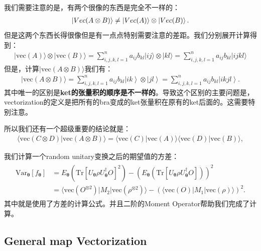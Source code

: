 我们需要注意的是，有两个很像的东西是完全不一样的：
\begin{align}
  \left| Vec(A \otimes B) \right\rangle \neq \left| Vec(A) \right\rangle \otimes \left| Vec(B) \right\rangle.
\end{align}
但是这两个东西长得很像但是有一点点特别需要注意的差距。我们分别展开计算得到：
\begin{align}
  |\mathrm{vec}(A)\rangle\otimes|\mathrm{vec}(B)\rangle=\sum_{i,j,k,l=1}^na_{ij}\left.b_{kl}\right.|ij\rangle\otimes|kl\rangle=\sum_{i,j,k,l=1}^na_{ij}\left.b_{kl}\right.|ijkl\rangle
\end{align}
但是，计算$ |\mathrm{vec}(A\otimes B)\rangle $我们有：
\begin{align}
  |\mathrm{vec}(A\otimes B)\rangle=\sum_{i,j,k,l=1}^na_{ij}\left.b_{kl}\right.\left|ik\right\rangle\otimes\left|jl\right\rangle=\sum_{i,j,k,l=1}^na_{ij}\left.b_{kl}\right.\left|ikjl\right\rangle.
\end{align}
其中唯一的区别是\textbf{ket的张量积的顺序是不一样的}。导致这个区别的主要问题是，vectorization的定义是把所有的bra变成的ket张量积在原有的ket后面的。这需要特别注意。

所以我们还有一个超级重要的结论就是：
\begin{align}
  \langle\mathrm{vec}(C\otimes D)|\mathrm{vec}(A\otimes B)\rangle=\langle\mathrm{vec}(C)|\mathrm{vec}(A)\rangle\langle\mathrm{vec}(D)|\mathrm{vec}(B)\rangle,
\end{align}


\bigskip
{}

我们计算一个random unitary变换之后的期望值的方差：
\begin{align}
  \begin{aligned}\mathrm{Var}_{\boldsymbol{\theta}}[f_{\boldsymbol{\theta}}]&=E_{\boldsymbol{\theta}}\left(\mathrm{Tr}\left[U_{\boldsymbol{\theta}}\rho U_{\boldsymbol{\theta}}^\dagger O\right]^2\right)-\left(E_{\boldsymbol{\theta}}\left(\mathrm{Tr}\left[U_{\boldsymbol{\theta}}\rho U_{\boldsymbol{\theta}}^\dagger O\right]\right)\right)^2\\&=\langle\mathrm{vec}(O^{\otimes2})|M_2|\mathrm{vec}(\rho^{\otimes2})\rangle-(\langle\mathrm{vec}(O)|M_1|\mathrm{vec}(\rho)\rangle)^2.\end{aligned}
\end{align}
其中就是使用了方差的计算公式。并且二阶的Moment Operator帮助我们完成了计算。


\subsection{General map Vectorization}

